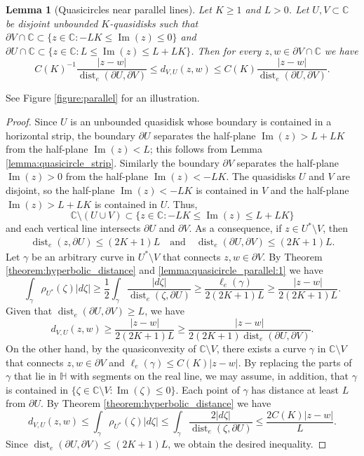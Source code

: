 \documentclass[letterpaper]{amsart}
\theoremstyle{plain}
\newtheorem{lemma}[theorem]{Lemma}
\theoremstyle{definition}
\theoremstyle{remark}
\numberwithin{equation}{section}
\numberwithin{theorem}{section}
\newcommand{\C}{\mathbb C}
\DeclareMathOperator{\dist}{dist}
\DeclareMathOperator{\im}{Im}
\begin{document}
\begin{lemma}[Quasicircles near parallel lines]\label{lemma:quasicircle_parallel}
Let $K\geq 1$ and $L>0$. Let $U,V\subset \C$ be disjoint unbounded $K$-quasidisks such that $\partial V\cap \C\subset \{z\in \C: -LK\leq  \im(z)\leq 0 \}$ and $\partial U\cap \C \subset \{z\in \C: L\leq \im(z)\leq  L+LK\}$. Then for every $z,w\in \partial V\cap \C$ we have
$$ C(K)^{-1}\frac{|z-w|}{\dist_e(\partial U,\partial V)}\leq d_{V,U}(z,w)\leq C(K)\frac{|z-w|}{\dist_e(\partial U,\partial V)}.$$
\end{lemma}

See Figure \ref{figure:parallel} for an illustration.
\begin{proof}
Since $U$ is an unbounded quasidisk whose boundary is contained in a horizontal strip, the boundary $\partial U$ separates the half-plane $\im(z)>L+LK$ from the half-plane $\im(z)<L$; this follows from Lemma \ref{lemma:quasicircle_strip}. Similarly the boundary $\partial V$ separates the half-plane $\im(z)>0$ from the half-plane $\im(z)<-LK$. The quasidisks $U$ and $V$ are disjoint, so the half-plane $\im(z)<-LK$ is contained in $V$ and the half-plane $\im(z)>L+LK$ is contained in $U$. Thus, 
$$\C\setminus (U\cup V)\subset\{z\in \C: -LK\leq \im(z)\leq L+LK\}$$
and each vertical line intersects $\partial U$ and $\partial V$. As a consequence, if $z\in U^*\setminus V$, then
\begin{align}\label{lemma:quasicircle_parallel:1}
\dist_e(z,\partial U)\leq (2K+1)L \quad \text{and} \quad \dist_e(\partial U,\partial V)\leq (2K+1)L.
\end{align} 
Let $\gamma$ be an arbitrary curve in $U^*\setminus V$ that connects $z,w\in \partial V$. By Theorem \ref{theorem:hyperbolic_distance} and \eqref{lemma:quasicircle_parallel:1} we have
$$\int_{\gamma} \rho_{U^*}(\zeta)|d\zeta| \geq \frac{1}{2}\int_{\gamma} \frac{|d\zeta|}{\dist_e(\zeta,\partial U)}\geq \frac{\ell_e(\gamma)}{2(2K+1)L}  \geq \frac{|z-w|}{2(2K+1)L} .$$
Given that $\dist_e(\partial U,\partial V)\geq L$, we have
$$d_{V,U}(z,w)\geq \frac{|z-w|}{2(2K+1)L}\geq \frac{|z-w|}{2(2K+1)\dist_e(\partial U,\partial V)}.$$
On the other hand, by the quasiconvexity of $\C\setminus  V$, there exists a curve $\gamma$ in $\C\setminus V$ that connects $z,w\in \partial V$ and $\ell_e(\gamma)\leq C(K)|z-w|$. By replacing the parts of $\gamma$ that lie in $\mathbb H$ with segments on the real line, we may assume, in addition, that $\gamma$ is contained in  $\{\zeta\in \C\setminus V: \im(\zeta)\leq 0\}$. Each point of $\gamma$ has distance at least $L$ from $\partial U$. By Theorem \ref{theorem:hyperbolic_distance} we have
$$d_{V,U}(z,w) \leq \int_{\gamma} \rho_{U^*}(\zeta)|d\zeta|\leq \int_{\gamma}\frac{2|d\zeta|}{\dist_e(\zeta,\partial U)}\leq \frac{2C(K)|z-w|}{L}.$$
Since $\dist_e(\partial U,\partial V)\leq (2K+1)L$, we obtain the desired inequality.
\end{proof}
\end{document}
